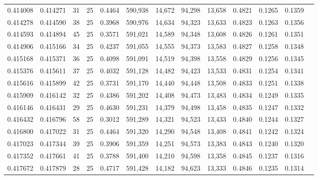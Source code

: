 \begin{tabular}{rrrrrrrrrrrrr}
0.414008 & 0.414271 &    31 &  25 &                                     0.4464 & 590,938 &  14,672 &  94,298 &  13,658 & 0.4821 & 0.1265 & 0.1359 \\
0.414278 & 0.414590 &    38 &  25 &                                     0.3968 & 590,976 &  14,634 &  94,323 &  13,633 & 0.4823 & 0.1263 & 0.1356 \\
0.414593 & 0.414894 &    45 &  25 &                                     0.3571 & 591,021 &  14,589 &  94,348 &  13,608 & 0.4826 & 0.1261 & 0.1351 \\
0.414906 & 0.415166 &    34 &  25 &                                     0.4237 & 591,055 &  14,555 &  94,373 &  13,583 & 0.4827 & 0.1258 & 0.1348 \\
0.415168 & 0.415371 &    36 &  25 &                                     0.4098 & 591,091 &  14,519 &  94,398 &  13,558 & 0.4829 & 0.1256 & 0.1345 \\
0.415376 & 0.415611 &    37 &  25 &                                     0.4032 & 591,128 &  14,482 &  94,423 &  13,533 & 0.4831 & 0.1254 & 0.1341 \\
0.415616 & 0.415899 &    42 &  25 &                                     0.3731 & 591,170 &  14,440 &  94,448 &  13,508 & 0.4833 & 0.1251 & 0.1338 \\
0.415909 & 0.416142 &    32 &  25 &                                     0.4386 & 591,202 &  14,408 &  94,473 &  13,483 & 0.4834 & 0.1249 & 0.1335 \\
0.416146 & 0.416431 &    29 &  25 &                                     0.4630 & 591,231 &  14,379 &  94,498 &  13,458 & 0.4835 & 0.1247 & 0.1332 \\
0.416432 & 0.416796 &    58 &  25 &                                     0.3012 & 591,289 &  14,321 &  94,523 &  13,433 & 0.4840 & 0.1244 & 0.1327 \\
0.416800 & 0.417022 &    31 &  25 &                                     0.4464 & 591,320 &  14,290 &  94,548 &  13,408 & 0.4841 & 0.1242 & 0.1324 \\
0.417023 & 0.417344 &    39 &  25 &                                     0.3906 & 591,359 &  14,251 &  94,573 &  13,383 & 0.4843 & 0.1240 & 0.1320 \\
0.417352 & 0.417661 &    41 &  25 &                                     0.3788 & 591,400 &  14,210 &  94,598 &  13,358 & 0.4845 & 0.1237 & 0.1316 \\
0.417672 & 0.417879 &    28 &  25 &                                     0.4717 & 591,428 &  14,182 &  94,623 &  13,333 & 0.4846 & 0.1235 & 0.1314 \\

\end{tabular}
